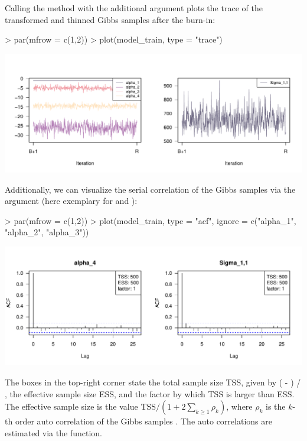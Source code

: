 \documentclass[article]{jss}
\newcommand{\fct}[1]{\code{#1()}}
\begin{document}
Calling the \fct{plot} method with the additional argument  plots the trace of the transformed and thinned Gibbs samples after the burn-in:

\begin{Schunk}
\begin{Sinput}
> par(mfrow = c(1,2))
> plot(model_train, type = "trace")
\end{Sinput}
\end{Schunk}
\includegraphics{rprobitb_oelschlaeger_bauer-model-train-trace}

Additionally, we can visualize the serial correlation of the Gibbs samples via the argument  (here exemplary for  and ):

\begin{Schunk}
\begin{Sinput}
> par(mfrow = c(1,2))
> plot(model_train, type = "acf", ignore = c("alpha_1", "alpha_2", "alpha_3"))
\end{Sinput}
\end{Schunk}
\includegraphics{rprobitb_oelschlaeger_bauer-model-train-acf}

The boxes in the top-right corner state the total sample size TSS, given by ( - ) / , the effective sample size ESS, and the factor by which TSS is larger than ESS. The effective sample size is the value $\text{TSS} / (1 + 2\sum_{k\geq 1} \rho_k)$, where $\rho_k$ is the $k$-th order auto correlation of the Gibbs samples \citep{Marin:2014}. The auto correlations are estimated via the \fct{stats::acf} function.
\end{document}
